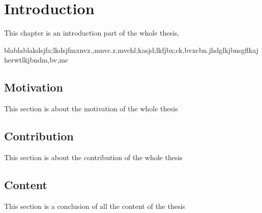 \chapter{Introduction}
This chapter is an introduction part of the whole thesis,

blablablakdsjfa;lkdsjfmxnvz.,mnvc.z,mvchl;kasjd;lkfjbx;ck,bvxcbn.jhdglkjbnsgflkajherwtlkjbndm,bv,mc

\section{Motivation}
This section is about the motivation of the whole thesis

\section{Contribution}
This section is about the contribution of the whole thesis

\section{Content}
This section is a conclusion of all the content of the thesis

\cleardoublepage
